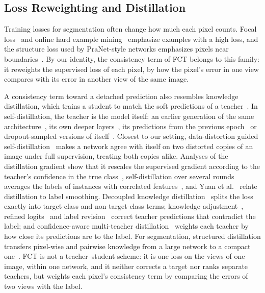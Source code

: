 \subsection{Loss Reweighting and Distillation}

Training losses for segmentation often change how much each pixel counts. Focal
loss~\cite{lin2017focal} and online hard example mining~\cite{shrivastava2016ohem} emphasize examples
with a high loss, and the structure loss used by PraNet-style networks emphasizes pixels near
boundaries~\cite{wei2020f3net}. By our identity, the consistency term of FCT belongs to this family: it
reweights the supervised loss of each pixel, by how the pixel's error in one view compares with its
error in another view of the same image.

A consistency term toward a detached prediction also resembles knowledge distillation, which trains a
student to match the soft predictions of a teacher~\cite{hinton2015distilling}. In self-distillation,
the teacher is the model itself: an earlier generation of the same
architecture~\cite{furlanello2018born}, its own deeper layers~\cite{zhang2019byot}, its predictions
from the previous epoch~\cite{kim2021pskd} or dropout-sampled versions of
itself~\cite{lee2023sddropout}. Closest to our setting, data-distortion guided
self-distillation~\cite{xu2019ddgsd} makes a network agree with itself on two distorted copies of an
image under full supervision, treating both copies alike. Analyses of the distillation gradient show
that it rescales the supervised gradient according to the teacher's confidence in the true
class~\cite{furlanello2018born,tang2020understanding}, self-distillation over several rounds averages
the labels of instances with correlated features~\cite{jeong2025selfdistill}, and Yuan et
al.~\cite{yuan2020revisiting} relate distillation to label smoothing. Decoupled knowledge
distillation~\cite{zhao2022dkd} splits the loss exactly into target-class and non-target-class terms;
knowledge adjustment~\cite{wen2021preparing}, refined logits~\cite{sun2025rld} and label
revision~\cite{lan2025labelrevision} correct teacher predictions that contradict the label; and
confidence-aware multi-teacher distillation~\cite{zhang2022camkd} weights each teacher by how close its
predictions are to the label. For segmentation, structured distillation transfers pixel-wise and
pairwise knowledge from a large network to a compact one~\cite{liu2019skd}. FCT is not a
teacher--student scheme: it is one loss on the views of one image, within one network, and it neither
corrects a target nor ranks separate teachers, but weights each pixel's consistency term by comparing
the errors of two views with the label.
